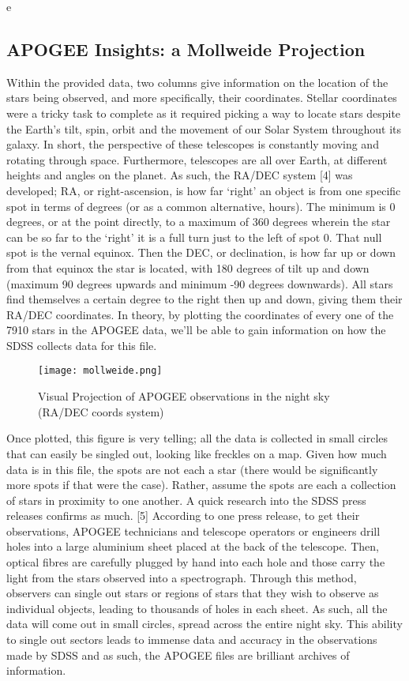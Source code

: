 e\documentclass{article}
\begin{document}
\subsection*{APOGEE Insights: a Mollweide Projection}
\indent Within the provided data, two columns give information on the location of the stars being observed, and more specifically, their coordinates. Stellar coordinates were a tricky task to complete as it required picking a way to locate stars despite the Earth’s tilt, spin, orbit and the movement of our Solar System throughout its galaxy. In short, the perspective of these telescopes is constantly moving and rotating through space. Furthermore, telescopes are all over Earth, at different heights and angles on the planet. As such, the RA/DEC system [4] was developed; RA, or right-ascension, is how far ‘right’ an object is from one specific spot in terms of degrees (or as a common alternative, hours). The minimum is 0 degrees, or at the point directly, to a maximum of 360 degrees wherein the star can be so far to the ‘right’ it is a full turn just to the left of spot 0. That null spot is the vernal equinox. Then the DEC, or declination, is how far up or down from that equinox the star is located, with 180 degrees of tilt up and down (maximum 90 degrees upwards and minimum -90 degrees downwards). All stars find themselves a certain degree to the right then up and down, giving them their RA/DEC coordinates. In theory, by plotting the coordinates of every one of the 7910 stars in the APOGEE data, we’ll be able to gain information on how the SDSS collects data for this file. \\
\begin{figure}[H]
    \centering
    \texttt{[image: mollweide.png]}
    \caption{Visual Projection of APOGEE observations in the night sky (RA/DEC coords system)}
    \label{fig:4}
\end{figure}
\indent Once plotted, this figure is very telling; all the data is collected in small circles that can easily be singled out, looking like freckles on a map. Given how much data is in this file, the spots are not each a star (there would be significantly more spots if that were the case). Rather, assume the spots are each a collection of stars in proximity to one another. A quick research into the SDSS press releases confirms as much. [5] According to one press release, to get their observations, APOGEE technicians and telescope operators or engineers drill holes into a large aluminium sheet placed at the back of the telescope. Then, optical fibres are carefully plugged by hand into each hole and those carry the light from the stars observed into a spectrograph. Through this method, observers can single out stars or regions of stars that they wish to observe as individual objects, leading to thousands of holes in each sheet. As such, all the data will come out in small circles, spread across the entire night sky. This ability to single out sectors leads to immense data and accuracy in the observations made by SDSS and as such, the APOGEE files are brilliant archives of information. \\
\end{document}
